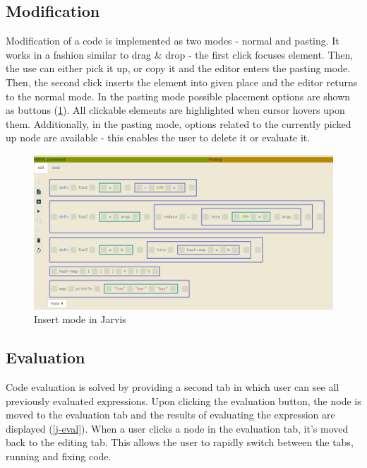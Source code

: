 \documentclass[11pt]{scrartcl}
\begin{document}
\subsection{Modification}
Modification of a code is implemented as two modes - normal and pasting. It works in a fashion similar to drag \& drop - the first click focuses element. Then, the use can either pick it up, or copy it and the editor enters the pasting mode. Then, the second click inserts the element into given place and the editor returns to the normal mode. In the pasting mode possible placement options are shown as buttons (\ref{j-insert}). All clickable elements are highlighted when cursor hovers upon them. Additionally, in the pasting mode, options related to the currently picked up node are available - this enables the user to delete it or evaluate it.

\begin{figure}[hbt]
  \includegraphics[scale=0.3]{img/j-insert_f}
  \caption{Insert mode in Jarvis}
  \label{j-insert}
\end{figure}

\subsection{Evaluation}
Code evaluation is solved by providing a second tab in which user can see all previously evaluated expressions. Upon clicking the evaluation button, the node is moved to the evaluation tab and the results of evaluating the expression are displayed (\ref{j-eval}). When a user clicks a node in the evaluation tab, it’s moved back to the editing tab. This allows the user to rapidly switch between the tabs, running and fixing code.
\end{document}
